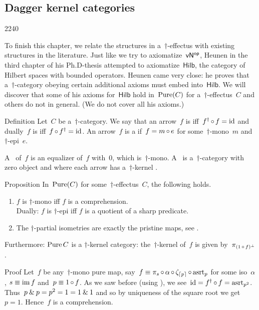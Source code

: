 \subsection{Dagger kernel categories}
\begin{parsec}{2240}%
\begin{point}{10}%
To finish this chapter, we relate the structures in a~$\dagger$-effectus
    with existing structures in the literature.
Just like we try to axiomatize~${\mathsf{vN}}{^{\mathsf{op}}}$,
    Heunen in the third chapter of his Ph.D-thesis attempted
    to axiomatize~$\mathsf{Hilb}$,
    the category of Hilbert spaces with bounded operators.
Heunen came very close:
    he proves that a~$\dagger$-category obeying
    certain additional axioms must embed into~$\mathsf{Hilb}$.
    \cite[3.7.18]{heunenphd}
We will discover that some of his axioms for~$\mathsf{Hilb}$
    hold in~$\operatorname{Pure}(C)$ for a~$\dagger$-effectus~$C$
    and others do not in general.
(We do not cover all his axioms.)
\end{point}
\begin{point}{20}{Definition}%
Let~$C$ be a~$\dagger$-category.
We say that an arrow~$f$
    is 
    iff~$f^\dagger \mathop{\circ} f = \mathrm{id}$
    and dually~$f$ is 
    iff~$f\mathop{\circ} f^\dagger = \mathrm{id}$.
An arrow~$f$ is a 
    if~$f = m \mathop{\circ} e$
    for some~$\dagger$-mono~$m$
    and~$\dagger$-epi~$e$.

A~ of~$f$
is an  equalizer of~$f$ with~$0$, which is~$\dagger$-mono.
A~ is a~$\dagger$-category
    with zero object and where each arrow has a~$\dagger$-kernel
\cite[3.2.20]{heunenphd}.
\end{point}
\begin{point}{30}{Proposition}%
In~$\operatorname{Pure}(C)$ for some~$\dagger$-effectus~$C$,
    the following holds.
\begin{enumerate}
\item
    $f$ is $\dagger$-mono iff $f$ is a comprehension. \\
    Dually:
    $f$ is $\dagger$-epi iff $f$ is a quotient of a sharp predicate.
\item
    The $\dagger$-partial isometries are exactly the pristine maps, see .
\end{enumerate}
Furthermore: $\operatorname{Pure} C$ is a $\dagger$-kernel category:
    the~$\dagger$-kernel of~$f$ is given by~$\pi_{(1 \mathop{\circ} f)^\perp}$.
\begin{point}{40}{Proof}%
Let~$f$ be any~$\dagger$-mono
pure map, say~$f \equiv \pi_s \mathop{\circ} \alpha \mathop{\circ} \zeta_{\left\lceil p\right\rceil}
        \mathop{\circ} \mathrm{asrt}_p$
        for some iso~$\alpha$, $s \equiv \operatorname{im} f$ and~$p \equiv 1 \mathop{\circ} f$.
As we saw before (using ),
    we see~$\mathrm{id} = f^\dagger \mathop{\circ} f = \mathrm{asrt}_{p^2}$.
Thus~$p \mathbin{\&} p = p^2 =  1 = 1 \mathbin{\&} 1$
    and so by uniqueness of the square root
    we get~$p = 1$.
Hence~$f$ is a comprehension.


\end{point}
\end{point}
\end{parsec}
